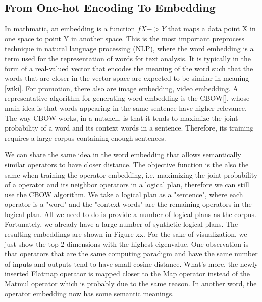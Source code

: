 \subsection{From One-hot Encoding To Embedding}
In mathmatic, an embedding is a function $f X -> Y$ that maps a data point X in one space to point Y in another space. 
This is the most important preprocess technique in natural language processing (NLP), where the word embedding is a term used for the representation of words for text analysis. 
It is typically in the form of a real-valued vector that encodes the meaning of the word such that the words that are closer in the vector space are expected to be similar in meaning [wiki]. 
For promotion, there also are image embedding, video embedding. 
A representative algorithm for generating word embedding is the CBOW[], whose main idea is that words appearing in the same sentence have higher relevance. 
The way CBOW works, in a nutshell, is that it tends to maximize the joint probability of a word and its context words in a sentence. 
Therefore, its training requires a large corpus containing enough sentences.

We can share the same idea in the word embedding that allows semantically similar operators to have closer distance. 
The objective function is the also the same when training the operator embedding, i.e. maximizing the joint probability of a operator and its neighbor operators in a logical plan, therefore we can still use the CBOW algorithm. 
We take a logical plan as a "sentence", where each operator is a "word" and the "context words" are the remaining operators in the logical plan. 
All we need to do is provide a number of logical plans as the corpus. 
Fortunately, we already have a large number of synthetic logical plans. 
The resulting embeddings are shown in Figure xx. 
For the sake of visualization, we just show the top-2 dimensions with the highest eigenvalue. 
One observation is that operators that are the same computing paradigm and have the same number of inputs and outputs tend to have small cosine distance. 
What's more, the newly inserted Flatmap operator is mapped closer to the Map operator instead of the Matmul operator which is probably due to the same reason. 
In another word, the operator embedding now has some semantic meanings.

